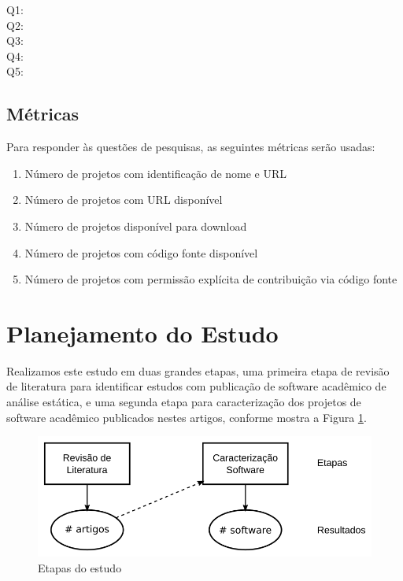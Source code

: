 \begin{description}
  \item [Q1:] \EstudoUmQuestaoUm
  \item [Q2:] \EstudoUmQuestaoDois
  \item [Q3:] \EstudoUmQuestaoTres
  \item [Q4:] \EstudoUmQuestaoQuatro
  \item [Q5:] \EstudoUmQuestaoCinco
\end{description}

\subsection{Métricas}

Para responder às questões de pesquisas, as seguintes métricas serão usadas:

\begin{enumerate}
  \item Número de projetos com identificação de nome e URL
  \item Número de projetos com URL disponível
  \item Número de projetos disponível para download
  \item Número de projetos com código fonte disponível
  \item Número de projetos com permissão explícita de contribuição via código fonte
\end{enumerate}


\section{Planejamento do Estudo} \label{estudo1:planejamento}

Realizamos este estudo em duas grandes etapas, uma primeira etapa de revisão de
literatura para identificar estudos com publicação de software acadêmico de
análise estática, e uma segunda etapa para caracterização dos projetos de
software acadêmico publicados nestes artigos, conforme mostra a Figura
\ref{estudo1-etapas}.

\begin{figure}[h]
  \center
  \includegraphics[scale=0.4]{imagens/estudo1-etapas.png}
  \caption{Etapas do estudo}
  \label{estudo1-etapas}
\end{figure}

